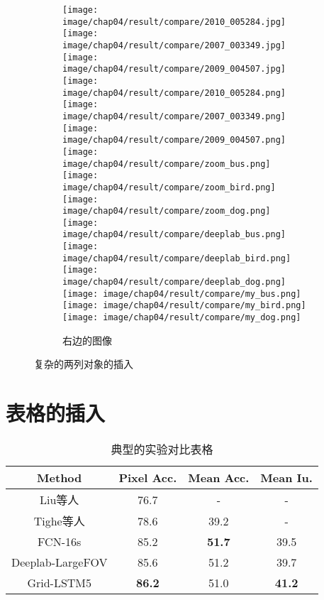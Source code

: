 \begin{figure}[h!]
\begin{subfigure}{0.4\textwidth}
        \centering
        \texttt{[image: image/chap04/result/compare/2010\_005284.jpg]}
        \texttt{[image: image/chap04/result/compare/2007\_003349.jpg]}
        \texttt{[image: image/chap04/result/compare/2009\_004507.jpg]} 
        \\
        \texttt{[image: image/chap04/result/compare/2010\_005284.png]}
        \texttt{[image: image/chap04/result/compare/2007\_003349.png]}
        \texttt{[image: image/chap04/result/compare/2009\_004507.png]} \\
        \texttt{[image: image/chap04/result/compare/zoom\_bus.png]}
        \texttt{[image: image/chap04/result/compare/zoom\_bird.png]}
        \texttt{[image: image/chap04/result/compare/zoom\_dog.png]} \\
        \texttt{[image: image/chap04/result/compare/deeplab\_bus.png]}
        \texttt{[image: image/chap04/result/compare/deeplab\_bird.png]}
        \texttt{[image: image/chap04/result/compare/deeplab\_dog.png]} \\
        \texttt{[image: image/chap04/result/compare/my\_bus.png]}
        \texttt{[image: image/chap04/result/compare/my\_bird.png]}
        \texttt{[image: image/chap04/result/compare/my\_dog.png]} 
        \caption{右边的图像}
        \label{fig:compare2}
    \end{subfigure}
    \caption{复杂的两列对象的插入}
    \label{fig:complex}
\end{figure}


\clearpage

\section{表格的插入}

\begin{table}[h] %
    \centering
        \caption{典型的实验对比表格}
        \begin{tabular}{*{4}{c}}
            \toprule
             Method & Pixel Acc. & Mean Acc. & Mean Iu.\\
            \midrule
            Liu等人\cite{liu2011sift}  & 76.7 & - & -\\
        Tighe等人\cite{tighe2013finding}  & 78.6 & 39.2 & -\\
            FCN-16s\cite{long2015fully} & 85.2 & \textbf{51.7} & 39.5\\
            Deeplab-LargeFOV\cite{chen14semantic} & 85.6 & 51.2 & 39.7\\
            \midrule
            Grid-LSTM5 & \textbf{86.2} & 51.0 & \textbf{41.2}\\
            \bottomrule
        \end{tabular}
        \label{tab:siftflow}
\end{table}

